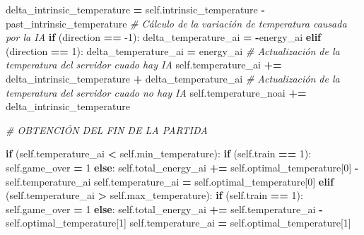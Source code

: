 \documentclass[]{book}
\newenvironment{Shaded}{\begin{snugshade}}{\end{snugshade}}
\newcommand{\CommentTok}[1]{\textcolor[rgb]{0.56,0.35,0.01}{\textit{#1}}}
\newcommand{\ControlFlowTok}[1]{\textcolor[rgb]{0.13,0.29,0.53}{\textbf{#1}}}
\newcommand{\DecValTok}[1]{\textcolor[rgb]{0.00,0.00,0.81}{#1}}
\newcommand{\NormalTok}[1]{#1}
\newcommand{\OperatorTok}[1]{\textcolor[rgb]{0.81,0.36,0.00}{\textbf{#1}}}
\newcommand{\VariableTok}[1]{\textcolor[rgb]{0.00,0.00,0.00}{#1}}
\begin{document}
\begin{Shaded}
\begin{Highlighting}[]
\NormalTok{        delta_intrinsic_temperature }\OperatorTok{=} \VariableTok{self}\NormalTok{.intrinsic_temperature}
                                      \OperatorTok{-}\NormalTok{ past_intrinsic_temperature}
        \CommentTok{# Cálculo de la variación de temperatura causada por la IA}
        \ControlFlowTok{if}\NormalTok{ (direction }\OperatorTok{==} \DecValTok{-1}\NormalTok{):}
\NormalTok{            delta_temperature_ai }\OperatorTok{=} \OperatorTok{-}\NormalTok{energy_ai}
        \ControlFlowTok{elif}\NormalTok{ (direction }\OperatorTok{==} \DecValTok{1}\NormalTok{):}
\NormalTok{            delta_temperature_ai }\OperatorTok{=}\NormalTok{ energy_ai}
        \CommentTok{# Actualización de la temperatura del servidor cuado hay IA}
        \VariableTok{self}\NormalTok{.temperature_ai }\OperatorTok{+=}\NormalTok{ delta_intrinsic_temperature }\OperatorTok{+}\NormalTok{ delta_temperature_ai}
        \CommentTok{# Actualización de la temperatura del servidor cuado no hay IA}
        \VariableTok{self}\NormalTok{.temperature_noai }\OperatorTok{+=}\NormalTok{ delta_intrinsic_temperature}

        \CommentTok{# OBTENCIÓN DEL FIN DE LA PARTIDA}

        \ControlFlowTok{if}\NormalTok{ (}\VariableTok{self}\NormalTok{.temperature_ai }\OperatorTok{<} \VariableTok{self}\NormalTok{.min_temperature):}
            \ControlFlowTok{if}\NormalTok{ (}\VariableTok{self}\NormalTok{.train }\OperatorTok{==} \DecValTok{1}\NormalTok{):}
                \VariableTok{self}\NormalTok{.game_over }\OperatorTok{=} \DecValTok{1}
            \ControlFlowTok{else}\NormalTok{:}
                \VariableTok{self}\NormalTok{.total_energy_ai }\OperatorTok{+=} \VariableTok{self}\NormalTok{.optimal_temperature[}\DecValTok{0}\NormalTok{]}
                                        \OperatorTok{-} \VariableTok{self}\NormalTok{.temperature_ai}
                \VariableTok{self}\NormalTok{.temperature_ai }\OperatorTok{=} \VariableTok{self}\NormalTok{.optimal_temperature[}\DecValTok{0}\NormalTok{]}
        \ControlFlowTok{elif}\NormalTok{ (}\VariableTok{self}\NormalTok{.temperature_ai }\OperatorTok{>} \VariableTok{self}\NormalTok{.max_temperature):}
            \ControlFlowTok{if}\NormalTok{ (}\VariableTok{self}\NormalTok{.train }\OperatorTok{==} \DecValTok{1}\NormalTok{):}
                \VariableTok{self}\NormalTok{.game_over }\OperatorTok{=} \DecValTok{1}
            \ControlFlowTok{else}\NormalTok{:}
                \VariableTok{self}\NormalTok{.total_energy_ai }\OperatorTok{+=} \VariableTok{self}\NormalTok{.temperature_ai}
                                        \OperatorTok{-} \VariableTok{self}\NormalTok{.optimal_temperature[}\DecValTok{1}\NormalTok{]}
                \VariableTok{self}\NormalTok{.temperature_ai }\OperatorTok{=} \VariableTok{self}\NormalTok{.optimal_temperature[}\DecValTok{1}\NormalTok{]}


\end{Highlighting}
\end{Shaded}
\end{document}
